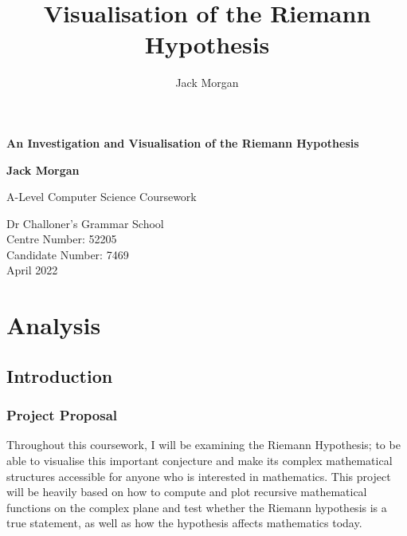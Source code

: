 \documentclass[12pt]{article}
\author{Jack Morgan}
\title{Visualisation of the Riemann Hypothesis}
\begin{document}
\begin{titlepage}
    \begin{center}
    \vspace*{6cm}

    \Huge
    \textbf{An Investigation and Visualisation of the Riemann Hypothesis}

    \vspace{0.5cm}
    \LARGE
    \vspace{1.5cm}

    \textbf{Jack Morgan}

    \vfill

    A-Level Computer Science Coursework\\

    \vspace{2cm}

    \Large
    Dr Challoner's Grammar School\\
    Centre Number: 52205\\
    Candidate Number: 7469\\
    April 2022\\

    \vspace{4cm}

    \end{center}
\end{titlepage}

\tableofcontents

\clearpage

\section{Analysis}

\subsection{Introduction}

\subsubsection{Project Proposal}

Throughout this coursework, I will be examining the Riemann Hypothesis; to be able to visualise this important conjecture and make its complex mathematical structures accessible for anyone who is interested in mathematics. This project will be heavily based on how to compute and plot recursive mathematical functions on the complex plane and test whether the Riemann hypothesis is a true statement, as well as how the hypothesis affects mathematics today.
\end{document}
